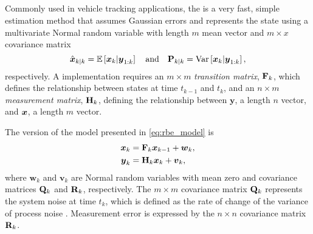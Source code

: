 \subsection{\kf{}}
\label{sec:kf}

Commonly used in vehicle tracking applications, the \kf{} is a very fast, simple estimation method \citep{Anderson_1979} that assumes Gaussian errors and represents the state using a multivariate Normal random variable with length $m$ mean vector and $m\times x$ covariance matrix
\begin{equation}
\label{eq:kf_estimators}
\hat{\boldsymbol x}_{k|k} = \mathbb{E}\left[\boldsymbol x_k | \boldsymbol{y}_{1:k}\right]
\quad\text{and}\quad
\mathbf{P}_{k|k} = \mathrm{Var}\left[\boldsymbol x_k | \boldsymbol{y}_{1:k}\right],
\end{equation}
respectively. A \kf{} implementation requires an $m\times m$ \emph{transition matrix}, $\mathbf{F}_k$, which defines the relationship between states at time $t_{k-1}$ and $t_k$, and an $n\times m$ \emph{measurement matrix}, $\mathbf{H}_k$, defining the relationship between $\boldsymbol{y}$, a length $n$ vector, and $\boldsymbol x$, a length $m$ vector.


The \kf{} version of the model presented in \cref{eq:rbe_model} is
\begin{equation}
\label{eq:kf_model}
\begin{split}
\boldsymbol x_k &= \mathbf{F}_k\boldsymbol x_{k-1} + \boldsymbol{w}_k, \\
\boldsymbol{y}_k &= \mathbf{H}_k\boldsymbol x_k + \boldsymbol{v}_k,
\end{split}
\end{equation}
where $\boldsymbol{w}_k$ and $\boldsymbol{v}_k$ are Normal random variables with mean zero and covariance matrices $\mathbf{Q}_k$ and $\mathbf{R}_k$, respectively. The $m\times m$ covariance matrix $\mathbf{Q}_k$ represents the system noise at time $t_k$, which is defined as the rate of change of the variance of process noise \citep{Cathey_2003}. Measurement error is expressed by the $n\times n$ covariance matrix $\mathbf{R}_k$.

